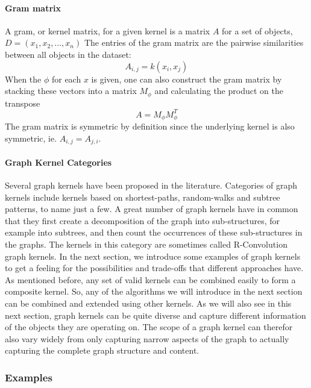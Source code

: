 \paragraph{Gram matrix}
A gram, or kernel matrix, for a given kernel is a matrix $A$ for a set of objects, $D = (x_1, x_2, \ldots, x_n)$
The entries of the gram matrix are the pairwise similarities between all objects in the dataset:
\begin{equation*}
    A_{i,j} = k(x_i, x_j)
\end{equation*}
When the $\phi$ for each $x$ is given, one can also construct the gram matrix by stacking these vectors into a matrix $M_{\phi}$ and calculating the product on the transpose
\begin{equation*}
    A = M_{\phi} M_{\phi}^T
\end{equation*}
The gram matrix is symmetric by definition since the underlying kernel is also symmetric, ie. $A_{i,j} = A_{j, i}$.

\paragraph{Graph Kernel Categories}
Several graph kernels have been proposed in the literature.
Categories of graph kernels include kernels based on shortest-paths, random-walks and subtree patterns, to name just a few.
A great number of graph kernels have in common that they first create a decomposition of the graph into sub-structures, for example into subtrees, and then count the occurrences of these sub-structures in the graphs.
The kernels in this category are sometimes called R-Convolution graph kernels.
In the next section, we introduce some examples of graph kernels to get a feeling for the possibilities and trade-offs that different approaches have.
As mentioned before, any set of valid kernels can be combined easily to form a composite kernel.
So, any of the algorithms we will introduce in the next section can be combined and extended using other kernels.
As we will also see in this next section, graph kernels can be quite diverse and capture different information of the objects they are operating on.
The scope of a graph kernel can therefor also vary widely from only capturing narrow aspects of the graph to actually capturing the complete graph structure and content.


\subsubsection{Examples}

